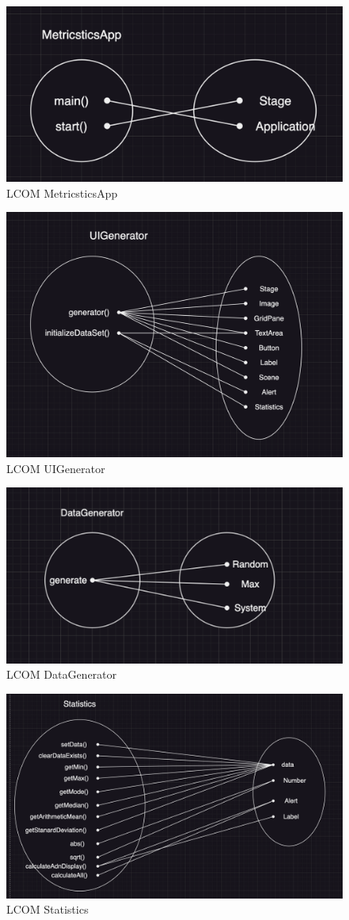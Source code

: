 \documentclass[12pt,letterpaper]{report}
\begin{document}
\begin{figure}
    \begin{center}
    \includegraphics[width=0.5\linewidth]{LCOM1.png}
    \end{center}
       \caption{LCOM MetricsticsApp \label{Code Sample}}
\end{figure}

\begin{figure}
    \begin{center}
    \includegraphics[width=0.5\linewidth]{LCOM2.png}
    \end{center}
       \caption{LCOM UIGenerator \label{Code Sample}}
\end{figure}

\begin{figure}
    \begin{center}
    \includegraphics[width=0.5\linewidth]{LCOM3.png}
    \end{center}
       \caption{LCOM DataGenerator \label{Code Sample}}
\end{figure}

\begin{figure}
    \begin{center}
    \includegraphics[width=0.5\linewidth]{LCOM4.png}
    \end{center}
       \caption{LCOM Statistics \label{Code Sample}}
\end{figure}
\end{document}
